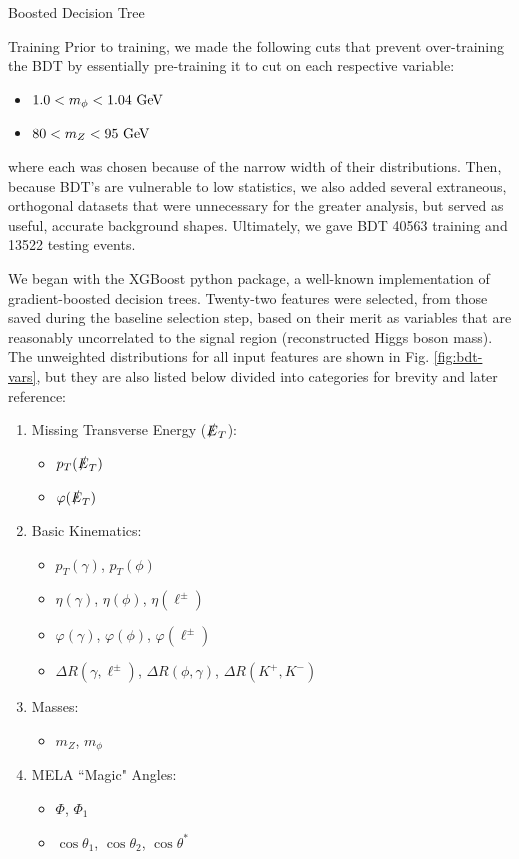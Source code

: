 \begin{section}{Boosted Decision Tree}
\begin{subsection}{Training}
Prior to training, we made the following cuts that prevent over-training the BDT by essentially pre-training it to cut on each respective variable:

\begin{itemize}
    \item $1.0 < m_{\phi} < 1.04\textnormal{ GeV}$
    \item $80 < m_{Z} < 95\textnormal{ GeV}$
\end{itemize}

\noindent where each was chosen because of the narrow width of their distributions. Then, because BDT's are vulnerable to low statistics, we also added several extraneous, orthogonal datasets that were unnecessary for the greater analysis, but served as useful, accurate background shapes. Ultimately, we gave BDT 40563 training and 13522 testing events.

We began with the XGBoost python package, a well-known implementation of gradient-boosted decision trees. Twenty-two features were selected, from those saved during the baseline selection step, based on their merit as variables that are reasonably uncorrelated to the signal region (reconstructed Higgs boson mass). The unweighted distributions for all input features are shown in Fig. \ref{fig:bdt-vars}, but they are also listed below divided into categories for brevity and later reference:
\begin{enumerate}[(i.)]
    \item Missing Transverse Energy ($\slashed{E}_{T}$):
    \begin{itemize}
        \item $p_{T}(\slashed{E}_{T})$
        \item $\varphi(\slashed{E}_{T})$
    \end{itemize}
    \item Basic Kinematics:
    \begin{itemize}
        \item $p_{T}(\gamma)$, $p_{T}(\phi)$
        \item $\eta(\gamma)$, $\eta(\phi)$, $\eta(\ell^{\pm})$
        \item $\varphi(\gamma)$, $\varphi(\phi)$, $\varphi(\ell^{\pm})$
        \item $\Delta R(\gamma, \ell^{\pm})$, $\Delta R(\phi, \gamma)$, $\Delta R(K^{+}, K^{-})$
    \end{itemize}
    \item Masses:
    \begin{itemize}
        \item $m_{Z}$, $m_{\phi}$
    \end{itemize}
    \item MELA ``Magic" Angles:
    \begin{itemize}
        \item $\Phi$, $\Phi_{1}$
        \item $\cos\theta_{1}$, $\cos\theta_{2}$, $\cos\theta^{*}$
    \end{itemize}
\end{enumerate}


\end{subsection}
\end{section}
